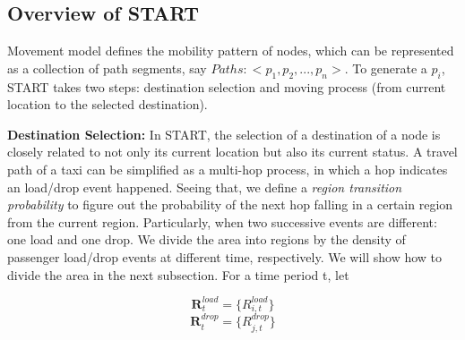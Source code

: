 
\subsection{Overview of START}

Movement model defines the mobility pattern of nodes, which can be represented as a collection of path segments, say $Paths:<p_1,p_2,...,p_n>$.  To generate a $p_i$, START takes two steps: destination selection and moving process (from current location to the selected destination).

\textbf{Destination Selection:} In START, the selection of a destination of a node is closely related to not only its current location but also its current status.
A travel path of a taxi can be simplified as a multi-hop process, in which a hop indicates an load/drop event happened.
  Seeing that, we define a \emph{ region transition probability} to figure out the probability of the next hop falling in a certain region from the current region. Particularly, when two successive events are different: one load and one drop.
 We divide the area into regions by the density of passenger load/drop events at different time, respectively. We will show how to divide the area in the next subsection. For a time period t, let

\begin{equation}
  \textbf{R}^{load}_t = \{R_{i,t}^{load}\}
\end{equation}
\begin{equation}
   \textbf{R}^{drop}_t = \{R_{j,t}^{drop}\}
\end{equation}

